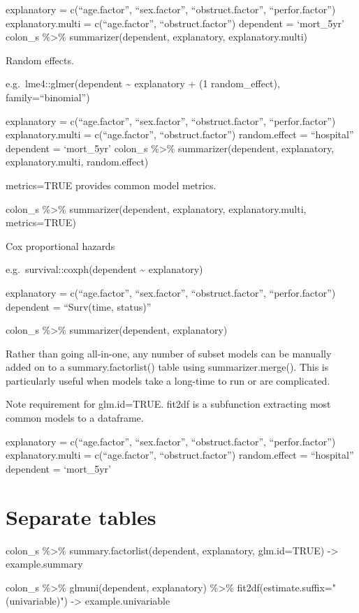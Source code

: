 \documentclass[]{article}
\begin{document}
explanatory = c(``age.factor'', ``sex.factor'', ``obstruct.factor'',
``perfor.factor'') explanatory.multi = c(``age.factor'',
``obstruct.factor'') dependent = `mort\_5yr' colon\_s \%\textgreater\%
summarizer(dependent, explanatory, explanatory.multi)

Random effects.

e.g.~lme4::glmer(dependent \textasciitilde{} explanatory + (1 \textbar{}
random\_effect), family=``binomial'')

explanatory = c(``age.factor'', ``sex.factor'', ``obstruct.factor'',
``perfor.factor'') explanatory.multi = c(``age.factor'',
``obstruct.factor'') random.effect = ``hospital'' dependent =
`mort\_5yr' colon\_s \%\textgreater\% summarizer(dependent, explanatory,
explanatory.multi, random.effect)

metrics=TRUE provides common model metrics.

colon\_s \%\textgreater\% summarizer(dependent, explanatory,
explanatory.multi, metrics=TRUE)

Cox proportional hazards

e.g.~survival::coxph(dependent \textasciitilde{} explanatory)

explanatory = c(``age.factor'', ``sex.factor'', ``obstruct.factor'',
``perfor.factor'') dependent = ``Surv(time, status)''

colon\_s \%\textgreater\% summarizer(dependent, explanatory)

Rather than going all-in-one, any number of subset models can be
manually added on to a summary.factorlist() table using
summarizer.merge(). This is particularly useful when models take a
long-time to run or are complicated.

Note requirement for glm.id=TRUE. fit2df is a subfunction extracting
most common models to a dataframe.

explanatory = c(``age.factor'', ``sex.factor'', ``obstruct.factor'',
``perfor.factor'') explanatory.multi = c(``age.factor'',
``obstruct.factor'') random.effect = ``hospital'' dependent =
`mort\_5yr'

\hypertarget{separate-tables}{%
\section{Separate tables}\label{separate-tables}}

colon\_s \%\textgreater\% summary.factorlist(dependent, explanatory,
glm.id=TRUE) -\textgreater{} example.summary

colon\_s \%\textgreater\% glmuni(dependent, explanatory)
\%\textgreater\% fit2df(estimate.suffix=" (univariable)")
-\textgreater{} example.univariable
\end{document}

